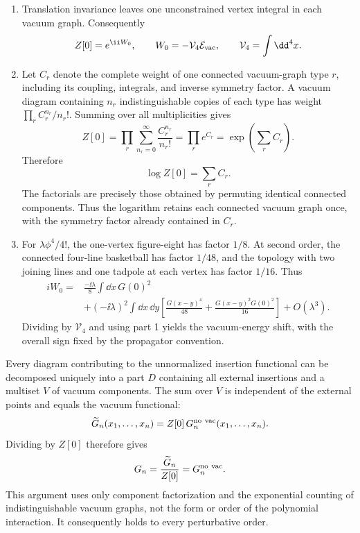 \begin{enumerate}
\begin{enumerate}
\item
Translation invariance leaves one unconstrained vertex integral in each
vacuum graph.  Consequently
\[
 Z[0]=e^{\ii W_0},\qquad
 W_0=-\mathcal V_4\mathcal E_{\rm vac},\qquad
 \mathcal V_4=\int \dd^4x.
\]
\item
Let \(C_r\) denote the complete weight of one connected vacuum-graph type
\(r\), including its coupling, integrals, and inverse symmetry factor.
A vacuum diagram containing \(n_r\) indistinguishable copies of each type
has weight
\(\prod_r C_r^{n_r}/n_r!\).  Summing over all multiplicities gives
\[
 Z[0]=\prod_r\sum_{n_r=0}^{\infty}\frac{C_r^{n_r}}{n_r!}
 =\prod_r e^{C_r}
 =\exp\left(\sum_r C_r\right).
\]
Therefore
\[
 \log Z[0]=\sum_r C_r.
\]
The factorials are precisely those obtained by permuting identical
connected components.  Thus the logarithm retains each connected vacuum
graph once, with the symmetry factor already contained in \(C_r\).
\item
For \(\lambda\phi^4/4!\), the one-vertex figure-eight has factor \(1/8\).
At second order, the connected four-line basketball has factor \(1/48\),
and the topology with two joining lines and one tadpole at each vertex
has factor \(1/16\).  Thus
\[
\begin{split}
 iW_0={}&\frac{-\ii\lambda}{8}\int \dd x\,G(0)^2\\
 &+(-\ii\lambda)^2\int \dd x\,\dd y\left[
 \frac{G(x-y)^4}{48}
 +\frac{G(x-y)^2G(0)^2}{16}\right]+O(\lambda^3).
\end{split}
\]
Dividing by \(\mathcal V_4\) and using part 1 yields the vacuum-energy
shift, with the overall sign fixed by the propagator convention.
\end{enumerate}

Every diagram contributing to the unnormalized insertion functional can be
decomposed uniquely into a part \(D\) containing all external insertions
and a multiset \(V\) of vacuum components.  The sum over \(V\) is independent
of the external points and equals the vacuum functional:
\[
 \widetilde G_n(x_1,\ldots,x_n)
 =Z[0]\,G_n^{\rm no\ vac}(x_1,\ldots,x_n).
\]
Dividing by \(Z[0]\) therefore gives
\[
 G_n=\frac{\widetilde G_n}{Z[0]}
 =G_n^{\rm no\ vac}.
\]
This argument uses only component factorization and the exponential
counting of indistinguishable vacuum graphs, not the form or order of the
polynomial interaction.  It consequently holds to every perturbative
order.


\end{enumerate}
